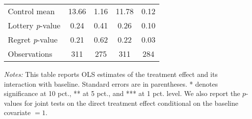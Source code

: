 \begin{table}[htbp]
{\begin{threeparttable}
\begin{tabular}{l*{4}{c}}
Control mean    &    13.66         &     1.16         &    11.78         &     0.12         \\
Lottery \emph{p}-value&     0.24         &     0.41         &     0.26         &     0.10         \\
Regret \emph{p}-value&     0.21         &     0.62         &     0.22         &     0.03         \\
Observations    &      311         &      275         &      311         &      284         \\
\bottomrule \end{tabular} \begin{tablenotes}[flushleft] \footnotesize \item \emph{Notes:} This table reports OLS estimates of the treatment effect and its interaction with baseline. Standard errors are in parentheses. * denotes significance at 10 pct., ** at 5 pct., and *** at 1 pct. level. We also report the \(p\)-values for joint tests on the direct treatment effect conditional on the baseline covariate $= 1$. \end{tablenotes} \end{threeparttable} } \end{table}

